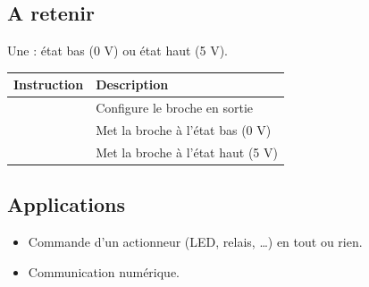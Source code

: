 \documentclass[a4paper,10pt,french]{book}
\begin{document}
\subsection{A retenir}
\label{\detokenize{3_bases/1_output_led:a-retenir}}
Une  : état bas (0 V) ou état haut (5 V).


\begin{savenotes}\sphinxattablestart
\centering
\begin{tabulary}{\linewidth}[t]{|T|T|}
\hline
\sphinxstyletheadfamily 
Instruction
&\sphinxstyletheadfamily 
Description
\\
\hline
{}
&
Configure le broche  en sortie
\\
\hline
{}
&
Met la broche  à l’état bas (0 V)
\\
\hline
{}
&
Met la broche  à l’état haut (5 V)
\\
\hline
\end{tabulary}
\par
\sphinxattableend\end{savenotes}


\subsection{Applications}
\label{\detokenize{3_bases/1_output_led:applications}}\begin{itemize}
\item {} 
Commande d’un actionneur (LED, relais, …) en tout ou rien.

\item {} 
Communication numérique.

\end{itemize}
\end{document}
